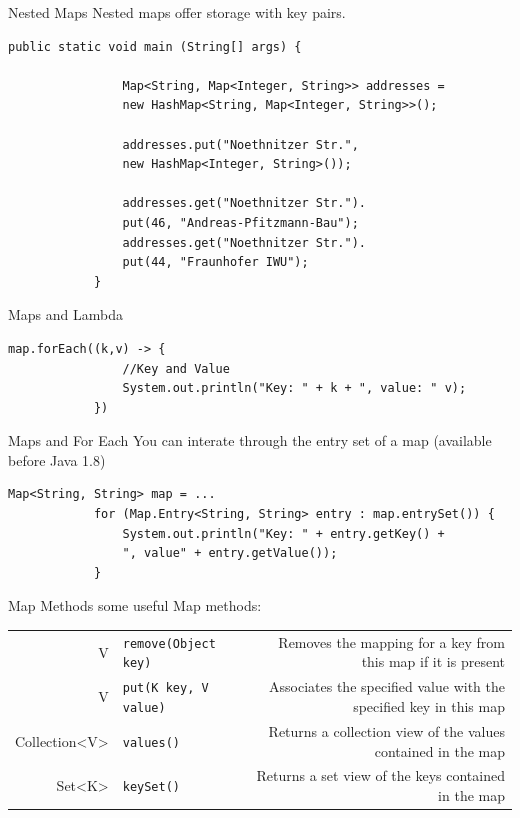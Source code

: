 	
	\begin{frame}[fragile]{Nested Maps}
		Nested maps offer storage with key pairs.
		\begin{lstlisting}[basicstyle=\ttfamily\scriptsize]
			public static void main (String[] args) {		
				
				Map<String, Map<Integer, String>> addresses = 
				new HashMap<String, Map<Integer, String>>();
				
				addresses.put("Noethnitzer Str.", 
				new HashMap<Integer, String>());
				
				addresses.get("Noethnitzer Str.").
				put(46, "Andreas-Pfitzmann-Bau");
				addresses.get("Noethnitzer Str.").
				put(44, "Fraunhofer IWU");
			}
		\end{lstlisting}
	\end{frame}
	
	\begin{frame}[fragile]{Maps and Lambda}
		\begin{lstlisting}[basicstyle=\ttfamily\scriptsize]
			map.forEach((k,v) -> {
				//Key and Value
				System.out.println("Key: " + k + ", value: " v);
			})
		\end{lstlisting}
	\end{frame}
	
	\begin{frame}[fragile]{Maps and For Each}
		You can interate through the entry set of a map (available before Java 1.8)
		\begin{lstlisting}[basicstyle=\ttfamily\scriptsize]
			Map<String, String> map = ...
			for (Map.Entry<String, String> entry : map.entrySet()) {
				System.out.println("Key: " + entry.getKey() +
				", value" + entry.getValue());
			}
		\end{lstlisting}
	\end{frame}
	
		\begin{frame}[fragile]{Map Methods}
		some useful Map methods:\\
		\vspace{1em}
		\begin{tabular}{ r l r }
			V & \texttt{remove(Object key)}
			& \footnotesize{Removes the mapping for a key from this map if it is present} \\
			V &\texttt{put(K key, V value)}
			& \footnotesize{Associates the specified value with the specified key in this map} \\
			Collection<V> &\texttt{values()}
			& \footnotesize{Returns a collection view of the values contained in the map} \\
			Set<K> &\texttt{keySet()}
			& \footnotesize{Returns a set view of the keys contained in the map} \\
		\end{tabular}
		
	\end{frame}
	
